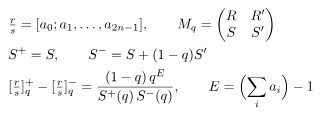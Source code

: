 \documentclass{article}
\begin{document}
\[
\begin{aligned}
&\tfrac rs=[a_0;a_1,\dots,a_{2n-1}],\qquad M_q=\begin{pmatrix}R&R'\\ S&S'\end{pmatrix}\\
&S^{+}=S,\qquad S^{-}=S+(1-q)S'\\
&[\tfrac rs]_q^{+}-[\tfrac rs]_q^{-}=\frac{(1-q)\,q^{E}}{S^{+}(q)\,S^{-}(q)},\qquad E=\Bigl(\sum_{i}a_i\Bigr)-1
\end{aligned}
\]
\end{document}
